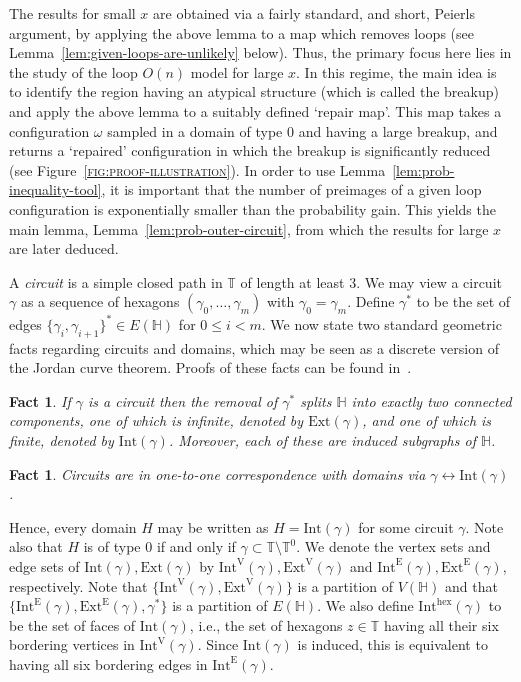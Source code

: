 \documentclass[12pt,reqno]{article}
\def\T{\mathbb{T}}
\newtheorem{fact}[theorem]{Fact}
\newcommand{\HH}{\mathbb{H}}
\newcommand{\VH}{V(\HH)}
\newcommand{\EH}{E(\HH)}
\newcommand{\reffig}[1] {\textsc{\ref{#1}}}
\newcommand{\Int}[1]{\mathrm{Int}(#1)}
\newcommand{\Ext}[1]{\mathrm{Ext}(#1)}
\newcommand{\IntEdge}[1]{\mathrm{Int}^\mathrm{E}(#1)}
\newcommand{\IntVert}[1]{\mathrm{Int}^\mathrm{V}(#1)}
\newcommand{\ExtEdge}[1]{\mathrm{Ext}^\mathrm{E}(#1)}
\newcommand{\ExtVert}[1]{\mathrm{Ext}^\mathrm{V}(#1)}
\newcommand{\IntHex}[1]{\mathrm{Int}^{\mathrm{hex}}(#1)}
\begin{document}
The results for small $x$ are obtained via a fairly standard, and short, Peierls argument, by applying the above lemma to a map which removes loops (see Lemma~\ref{lem:given-loops-are-unlikely} below). Thus, the primary focus here lies in the study of the loop $O(n)$ model for large
$x$. In this regime, the main idea is to identify the region having an atypical structure (which is called the breakup) and apply the above lemma to a suitably defined `repair map'.
This map takes a configuration $\omega$ sampled in a domain of type 0 and having a large breakup, and
returns a `repaired' configuration in which the breakup is significantly reduced (see Figure~\reffig{fig:proof-illustration}).
In order to use Lemma~\ref{lem:prob-inequality-tool}, it is important that
the number of preimages of a given loop configuration is exponentially smaller than the probability gain. This yields the main lemma, Lemma~\ref{lem:prob-outer-circuit}, from which the results for large $x$ are later deduced.


\medbreak
{}
A {\em circuit} is a simple closed path in $\T$ of length at least $3$. We may view a circuit $\gamma$ as a sequence of hexagons $(\gamma_0,\dots,\gamma_m)$ with $\gamma_0=\gamma_m$.
Define $\gamma^*$ to be the set of edges
$\{\gamma_i,\gamma_{i+1}\}^* \in \EH$ for $0\le i<m$.
We now state two standard geometric facts regarding circuits and domains, which may be seen as a discrete version of the Jordan curve theorem. Proofs of these facts can be found in~\cite[Appendix B]{DCPSS14}.

\begin{fact}\label{fact:gamma-int-ext}
If $\gamma$ is a circuit then the removal of $\gamma^*$ splits $\HH$ into exactly two connected components, one of which is infinite, denoted by $\Ext\gamma$, and one of which is finite, denoted by $\Int\gamma$. Moreover, each of these are induced subgraphs of $\HH$.
\end{fact}

\begin{fact}\label{fact:circuit-domain-bijection}
    Circuits are in one-to-one correspondence with domains via $\gamma \leftrightarrow \Int\gamma$.
\end{fact}


Hence, every domain $H$ may be written as $H=\Int\gamma$ for some circuit $\gamma$.
Note also that $H$ is of type $0$ if and only if $\gamma \subset \T \setminus \T^0$.
We denote the vertex sets and edge sets
of $\Int\gamma,\Ext\gamma$ by $\IntVert\gamma,\ExtVert\gamma$ and
$\IntEdge\gamma,\ExtEdge\gamma$, respectively. Note that $\{
\IntVert\gamma, \ExtVert\gamma \}$ is a partition of $\VH$ and
that $\{ \IntEdge\gamma, \ExtEdge\gamma, \gamma^* \}$ is a partition
of $\EH$. We also define $\IntHex\gamma$ to be the set of faces
of $\Int\gamma$, i.e., the set of hexagons $z\in\T$ having all their
six bordering vertices in $\IntVert\gamma$. Since $\Int\gamma$ is
induced, this is equivalent to having all six bordering edges in
$\IntEdge\gamma$.
\end{document}
